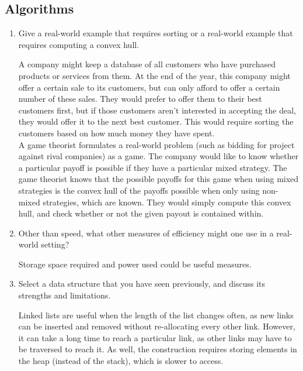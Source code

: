 \documentclass[Chapter01]{subfiles}
\begin{document}
	\subsection{Algorithms}

	\begin{enumerate}[leftmargin=\labelsep]
		\item Give a real-world example that requires sorting or a real-world example that requires computing a convex hull.
		\begin{answer}
			A company might keep a database of all customers who have purchased products or services from them. At the end of the year, this company might offer a certain sale to its customers, but can only afford to offer a certain number of these sales. They would prefer to offer them to their best customers first, but if those customers aren't interested in accepting the deal, they would offer it to the next best customer. This would require sorting the customers based on how much money they have spent.\\
			\hfill
			A game theorist formulates a real-world problem (such as bidding for project against rival companies) as a game. The company would like to know whether a particular payoff is possible if they have a particular mixed strategy. The game theorist knows that the possible payoffs for this game when using mixed strategies is the convex hull of the payoffs possible when only using non-mixed strategies, which are known. They would simply compute this convex hull, and check whether or not the given payout is contained within.
		\end{answer}

		\item Other than speed, what other measures of efficiency might one use in a real-world setting?
		\begin{answer}
			Storage space required and power used could be useful measures.
		\end{answer}

		\item Select a data structure that you have seen previously, and discuss its strengths and limitations.
		\begin{answer}
			Linked lists are useful when the length of the list changes often, as new links can be inserted and removed without re-allocating every other link. However, it can take a long time to reach a particular link, as other links may have to be traversed to reach it. As well, the construction requires storing elements in the heap (instead of the stack), which is slower to access.
		\end{answer}


\end{enumerate}
\end{document}
